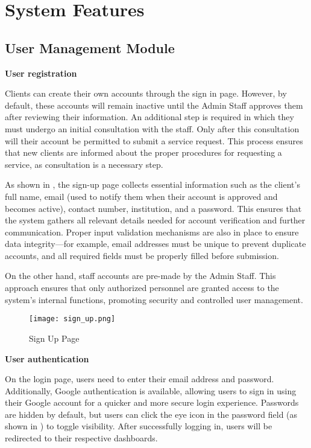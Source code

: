 \section{System Features}

\subsection{User Management Module}

\textbf{User registration}

Clients can create their own accounts through the sign in page. However, by default, these accounts will remain inactive until the Admin Staff approves them after reviewing their information. An additional step is required in which they must undergo an initial consultation with the staff. Only after this consultation will their account be permitted to submit a service request. This process ensures that new clients are informed about the proper procedures for requesting a service, as consultation is a necessary step.

As shown in , the sign-up page collects essential information such as the client's full name, email (used to notify them when their account is approved and becomes active), contact number, institution, and a password. This ensures that the system gathers all relevant details needed for account verification and further communication. Proper input validation mechanisms are also in place to ensure data integrity—for example, email addresses must be unique to prevent duplicate accounts, and all required fields must be properly filled before submission.

On the other hand, staff accounts are pre-made by the Admin Staff. This approach ensures that only authorized personnel are granted access to the system’s internal functions, promoting security and controlled user management.

\begin{figure}[h]
	\centering 
	\texttt{[image: sign\_up.png]}
	\caption{Sign Up Page}
	\label{fig:signup_page}
\end{figure}

\textbf{User authentication}

On the login page, users need to enter their email address and password. Additionally, Google authentication is available, allowing users to sign in using their Google account for a quicker and more secure login experience. Passwords are hidden by default, but users can click the eye icon in the password field (as shown in ) to toggle visibility. After successfully logging in, users will be redirected to their respective dashboards.

